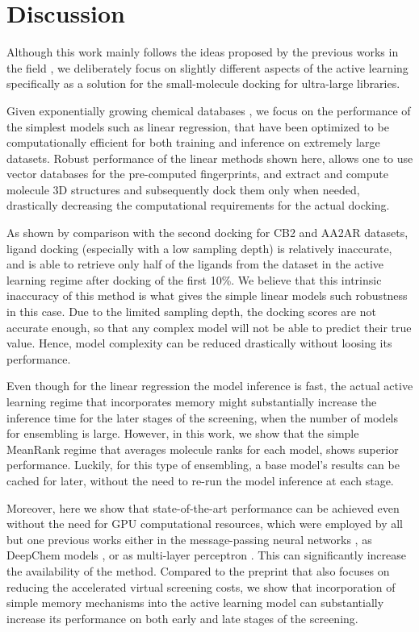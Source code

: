 \section{Discussion}

Although this work mainly follows the ideas proposed by the previous works in the field \cite{deepdocking, logistic_regression, Yang2021_shoichet_active_learning, Graff2021AcceleratingLearning}, we deliberately focus on slightly different aspects of the active learning specifically as a solution for the small-molecule docking for ultra-large libraries. 

Given exponentially growing chemical databases \cite{warr_exploration_2022, lyu_modeling_2023}, we focus on the performance of the simplest models such as linear regression, that have been optimized to be computationally efficient for both training and inference on extremely large datasets. Robust performance of the linear methods shown here, allows one to use vector databases \cite{noauthor_vector_nodate, noauthor_qdrant_nodate, johnson2019_faiss_vector_database} for the pre-computed fingerprints, and extract and compute molecule 3D structures and subsequently dock them only when needed, drastically decreasing the computational requirements for the actual docking.

As shown by comparison with the second docking for CB2 and AA2AR datasets, ligand docking (especially with a low sampling depth) is relatively inaccurate, and is able to retrieve only half of the ligands from the dataset in the active learning regime after docking of the first 10\%. We believe that this intrinsic inaccuracy of this method is what gives the simple linear models such robustness in this case. Due to the limited sampling depth, the docking scores are not accurate enough, so that any complex model will not be able to predict their true value. Hence, model complexity can be reduced drastically without loosing its performance.

Even though for the linear regression the model inference is fast, the actual active learning regime that incorporates memory might substantially increase the inference time for the later stages of the screening, when the number of models for ensembling is large. However, in this work, we show that the simple MeanRank regime that averages molecule ranks for each model, shows superior performance. Luckily, for this type of ensembling, a base model's results can be cached for later, without the need to re-run the model inference at each stage.

Moreover, here we show that state-of-the-art performance can be achieved even without the need for GPU computational resources, which were employed by all but one previous works either in the message-passing neural networks \cite{Graff2021AcceleratingLearning}, as DeepChem models \cite{Yang2021_shoichet_active_learning}, or as multi-layer perceptron \cite{deepdocking}. This can significantly increase the availability of the method. Compared to the preprint \cite{logistic_regression} that also focuses on reducing the accelerated virtual screening costs, we show that incorporation of simple memory mechanisms into the active learning model can substantially increase its performance on both early and late stages of the screening.
